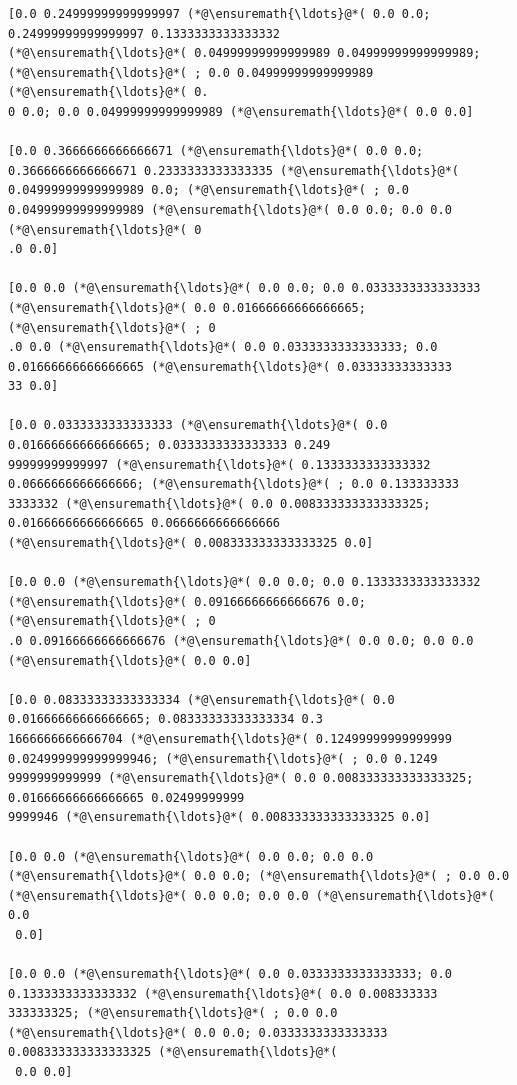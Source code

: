 \documentclass[12pt,a4paper]{article}
\begin{document}
\begin{lstlisting}
[0.0 0.24999999999999997 (*@\ensuremath{\ldots}@*( 0.0 0.0; 0.24999999999999997 0.1333333333333332 
(*@\ensuremath{\ldots}@*( 0.04999999999999989 0.04999999999999989; (*@\ensuremath{\ldots}@*( ; 0.0 0.04999999999999989 (*@\ensuremath{\ldots}@*( 0.
0 0.0; 0.0 0.04999999999999989 (*@\ensuremath{\ldots}@*( 0.0 0.0]

[0.0 0.3666666666666671 (*@\ensuremath{\ldots}@*( 0.0 0.0; 0.3666666666666671 0.2333333333333335 (*@\ensuremath{\ldots}@*( 
0.04999999999999989 0.0; (*@\ensuremath{\ldots}@*( ; 0.0 0.04999999999999989 (*@\ensuremath{\ldots}@*( 0.0 0.0; 0.0 0.0 (*@\ensuremath{\ldots}@*( 0
.0 0.0]

[0.0 0.0 (*@\ensuremath{\ldots}@*( 0.0 0.0; 0.0 0.0333333333333333 (*@\ensuremath{\ldots}@*( 0.0 0.01666666666666665; (*@\ensuremath{\ldots}@*( ; 0
.0 0.0 (*@\ensuremath{\ldots}@*( 0.0 0.0333333333333333; 0.0 0.01666666666666665 (*@\ensuremath{\ldots}@*( 0.03333333333333
33 0.0]

[0.0 0.0333333333333333 (*@\ensuremath{\ldots}@*( 0.0 0.01666666666666665; 0.0333333333333333 0.249
99999999999997 (*@\ensuremath{\ldots}@*( 0.1333333333333332 0.0666666666666666; (*@\ensuremath{\ldots}@*( ; 0.0 0.133333333
3333332 (*@\ensuremath{\ldots}@*( 0.0 0.008333333333333325; 0.01666666666666665 0.0666666666666666 
(*@\ensuremath{\ldots}@*( 0.008333333333333325 0.0]

[0.0 0.0 (*@\ensuremath{\ldots}@*( 0.0 0.0; 0.0 0.1333333333333332 (*@\ensuremath{\ldots}@*( 0.09166666666666676 0.0; (*@\ensuremath{\ldots}@*( ; 0
.0 0.09166666666666676 (*@\ensuremath{\ldots}@*( 0.0 0.0; 0.0 0.0 (*@\ensuremath{\ldots}@*( 0.0 0.0]

[0.0 0.08333333333333334 (*@\ensuremath{\ldots}@*( 0.0 0.01666666666666665; 0.08333333333333334 0.3
1666666666666704 (*@\ensuremath{\ldots}@*( 0.12499999999999999 0.024999999999999946; (*@\ensuremath{\ldots}@*( ; 0.0 0.1249
9999999999999 (*@\ensuremath{\ldots}@*( 0.0 0.008333333333333325; 0.01666666666666665 0.02499999999
9999946 (*@\ensuremath{\ldots}@*( 0.008333333333333325 0.0]

[0.0 0.0 (*@\ensuremath{\ldots}@*( 0.0 0.0; 0.0 0.0 (*@\ensuremath{\ldots}@*( 0.0 0.0; (*@\ensuremath{\ldots}@*( ; 0.0 0.0 (*@\ensuremath{\ldots}@*( 0.0 0.0; 0.0 0.0 (*@\ensuremath{\ldots}@*( 0.0
 0.0]

[0.0 0.0 (*@\ensuremath{\ldots}@*( 0.0 0.0333333333333333; 0.0 0.1333333333333332 (*@\ensuremath{\ldots}@*( 0.0 0.008333333
333333325; (*@\ensuremath{\ldots}@*( ; 0.0 0.0 (*@\ensuremath{\ldots}@*( 0.0 0.0; 0.0333333333333333 0.008333333333333325 (*@\ensuremath{\ldots}@*(
 0.0 0.0]


\end{lstlisting}
\end{document}
